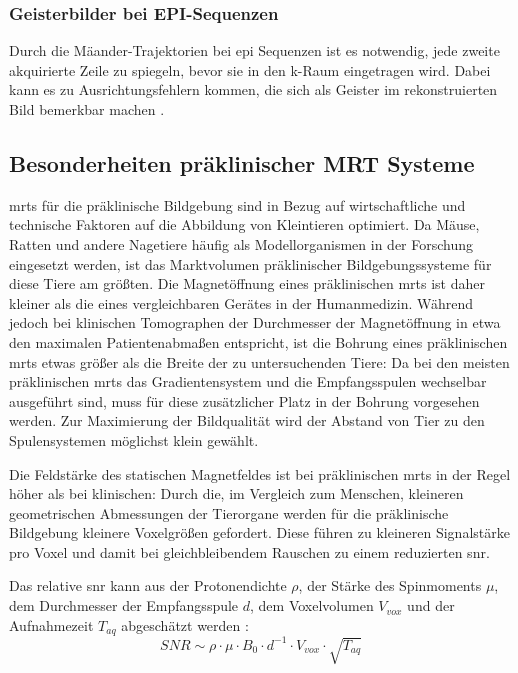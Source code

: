 \subsubsection{Geisterbilder bei EPI-Sequenzen}
Durch die Mäander-Trajektorien bei \gls{epi} Sequenzen ist es notwendig, jede zweite akquirierte Zeile zu spiegeln, bevor sie in den k-Raum eingetragen wird. Dabei kann es zu Ausrichtungsfehlern kommen, die sich als Geister im rekonstruierten Bild bemerkbar machen \cite{Ianni2018}.

\subsection{Besonderheiten präklinischer MRT Systeme}
\gls{mrt}s für die präklinische Bildgebung sind in Bezug auf wirtschaftliche und technische Faktoren auf die Abbildung von Kleintieren optimiert. Da Mäuse, Ratten und andere Nagetiere häufig als Modellorganismen in der Forschung eingesetzt werden, ist das Marktvolumen präklinischer Bildgebungssysteme für diese Tiere am größten. \cite{GBanimalStat} Die Magnetöffnung eines präklinischen \gls{mrt}s ist daher kleiner als die eines vergleichbaren Gerätes in der Humanmedizin. Während jedoch bei klinischen Tomographen der Durchmesser der Magnetöffnung in etwa den maximalen Patientenabmaßen entspricht, ist die Bohrung eines präklinischen \gls{mrt}s etwas größer als die Breite der zu untersuchenden Tiere: Da bei den meisten präklinischen \gls{mrt}s das Gradientensystem und die Empfangsspulen wechselbar ausgeführt sind, muss für diese zusätzlicher Platz in der Bohrung vorgesehen werden. Zur Maximierung der Bildqualität wird der Abstand von Tier zu den Spulensystemen möglichst klein gewählt.

Die Feldstärke des statischen Magnetfeldes ist bei präklinischen \gls{mrt}s in der Regel höher als bei klinischen: Durch die, im Vergleich zum Menschen, kleineren geometrischen Abmessungen der Tierorgane werden für die präklinische Bildgebung kleinere Voxelgrößen gefordert. Diese führen zu kleineren Signalstärke pro Voxel und damit bei gleichbleibendem Rauschen zu einem reduzierten \gls{snr}.

Das relative \gls{snr} kann aus der Protonendichte $\rho$, der Stärke des Spinmoments $\mu$, dem Durchmesser der Empfangsspule $d$, dem Voxelvolumen $V_{vox}$ und der Aufnahmezeit $T_{aq}$ abgeschätzt werden \cite[S.~161]{Kiessling2017}:
\begin{equation}
\label{eq:SNR}
	SNR \sim \rho \cdot \mu \cdot B_0 \cdot d^{-1} \cdot V_{vox} \cdot \sqrt{T_{aq}}
\end{equation}

